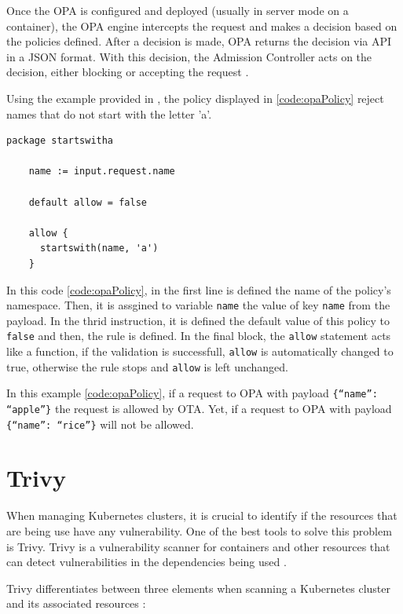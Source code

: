\documentclass[a4paper,11pt,openright,BCOR=15mm]{scrbook}
\begin{document}
Once the OPA is configured and deployed (usually in server mode on a container), the OPA engine intercepts the request and makes a decision based on the policies defined. After a decision is made, OPA returns the decision via API in a JSON format. With this decision, the Admission Controller acts on the decision, either blocking or accepting the request \cite{opa_doc_guides_nodate}.

Using the example provided in \cite{bruner_better_2020}, the policy displayed in \ref{code:opaPolicy} reject names that do not start with the letter 'a'.

\begin{lstlisting}[style=yaml,caption={OPA policy example},label=code:opaPolicy]
	package startswitha
	
	name := input.request.name
	
	default allow = false
	
	allow {
	  startswith(name, 'a')
	}
\end{lstlisting}

In this code \ref{code:opaPolicy}, in the first line is defined the name of the policy's namespace. Then, it is assgined to variable \texttt{name} the value of key \texttt{name} from the payload. In the thrid instruction, it is defined the default value of this policy to \texttt{false} and then, the rule is defined. In the final block, the \texttt{allow} statement acts like a function, if the validation is successfull, \texttt{allow} is automatically changed to true, otherwise the rule stops and \texttt{allow} is left unchanged.

In this example \ref{code:opaPolicy}, if a request to OPA with payload \texttt{\{``name'': ``apple''\}} the request is allowed by OTA. Yet, if a request to OPA with payload \texttt{\{``name'': ``rice''\}} will not be allowed.


\section{Trivy}\label{sect:complementMonitor}

When managing Kubernetes clusters, it is crucial to identify if the resources that are being use have any vulnerability. One of the best tools to solve this problem is Trivy. Trivy is a vulnerability scanner for containers and other resources that can detect vulnerabilities in the dependencies being used \cite{benhassan_deep_2024}.

Trivy differentiates between three elements when scanning a Kubernetes cluster and its associated resources \cite{trivy_doc_kubernetes_nodate}:
\end{document}
